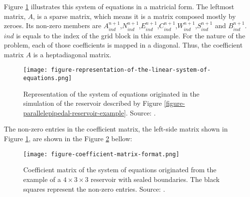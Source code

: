 %
Figure \ref{figure-representation-of-the-linear-system-of-equations} illustrates this system of equations in a matricial form. 
%
The leftmost matrix, $A$, is a sparse matrix, which means it is a matrix composed mostly by zeroes. 
%
Its non-zero members are $A^{n+1}_{ind}$,$N^{n+1}_{ind}$,$E^{n+1}_{ind}$,$C^{n+1}_{ind}$,$W^{n+1}_{ind}$,$S^{n+1}_{ind}$ and $B^{n+1}_{ind}$. $ind$ is equals to the index of the grid block in this example. 
%
For the nature of the problem, each of those coefficients is mapped in a diagonal. 
%
Thus, the coefficient matrix $A$ is a heptadiagonal matrix.
%
\begin{figure}[H]
	\centering
	\texttt{[image: figure-representation-of-the-linear-system-of-equations.png]}\\
	\caption{Representation of the system of equations originated in the simulation of the reservoir described by Figure \ref{figure-parallelepipedal-reservoir-example}. Source: \cite{Ertekin2001}.}
	\label{figure-representation-of-the-linear-system-of-equations}
\end{figure}
\noindent
%
The non-zero entries in the coefficient matrix, the left-side matrix shown in Figure \ref{figure-representation-of-the-linear-system-of-equations}, are shown in the Figure \ref{figure-coefficient-matrix-format} bellow:
%
\begin{figure}[H]
	\centering
	\texttt{[image: figure-coefficient-matrix-format.png]}\\
	\caption{Coefficient matrix of the system of equations originated from the \cite{Ertekin2001} example of a $ 4 \times 3 \times 3 $  reservoir with sealed boundaries. The black squares represent the non-zero entries. Source: \cite{Ertekin2001}.}
	\label{figure-coefficient-matrix-format}
\end{figure}